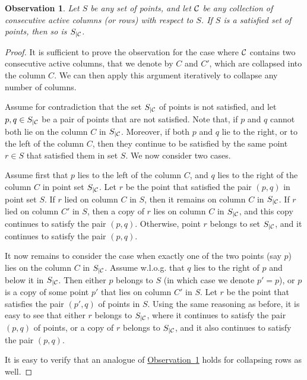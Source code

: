 \documentclass[11pt]{article}
\numberwithin{equation}{section}
\theoremstyle{definition}
\theoremstyle{plain}
\newcommand{\expref}[2]{\hyperref[#2]{#1~\ref{#2}}}
\newtheorem{myobs}[theorem]{Observation}
\begin{document}
\begin{myobs}\label{obs: collapsing columns}
Let $S$ be any set of points, and let ${\mathcal C}$ be any collection of consecutive active columns (or rows) with respect to $S$. If $S$ is a satisfied set of points, then so is $S_{|{\mathcal C}}$.
\end{myobs}
\begin{proof}
It is sufficient to prove the observation for the case where ${\mathcal C}$ contains two consecutive active columns, that we denote by $C$ and $C'$, which are collapsed into the column $C$. We can then apply this argument iteratively to collapse any number of columns.

Assume for contradiction that the set $S_{|{\mathcal C}}$ of points is not satisfied, and let $p,q\in S_{|{\mathcal C}}$ be a pair of points that are not satisfied. Note that, if $p$ and $q$ cannot both lie on the column $C$ in $S_{|{\mathcal C}}$. Moreover, if both $p$ and $q$ lie to the right, or to the left of the column $C$, then they continue to be satisfied by the same point $r\in S$ that satisfied them in set $S$. We now consider two cases.

Assume first that $p$ lies to the left of the column $C$, and $q$ lies to the right of the column $C$ in point set $S_{|{\mathcal C}}$. Let $r$ be the point that satisfied the pair $(p,q)$ in point set $S$. If $r$ lied on column $C$ in $S$, then it remains on column $C$ in $S_{|{\mathcal C}}$. If $r$ lied on column $C'$ in $S$, then a copy of $r$ lies on column $C$ in $S_{|{\mathcal C}}$, and this copy continues to satisfy the pair $(p,q)$. Otherwise, point $r$ belongs to set $S_{|{\mathcal C}}$, and it continues to satisfy the pair $(p,q)$.

It now remains to consider the case when exactly one of the two points (say $p$) lies on the column $C$ in $S_{|{\mathcal C}}$. Assume w.l.o.g. that $q$ lies to the right of $p$ and below it in $S_{|{\mathcal C}}$. Then either $p$ belongs to $S$ (in which case we denote $p'=p$), or $p$ is a copy of some point $p'$ that lies on column $C'$ in $S$. Let $r$ be the point that satisfies the pair $(p',q)$ of points in $S$. Using the same reasoning as before, it is easy to see that either $r$ belongs to $S_{|{\mathcal C}}$, where it continues to satisfy the pair $(p,q)$ of points, or  a copy of $r$ belongs to $S_{|{\mathcal C}}$, and it also continues to satisfy the pair $(p,q)$.

It is easy to verify that an analogue of \expref{Observation}{obs: collapsing columns} holds for collapsing rows as well.
\end{proof}
\end{document}

